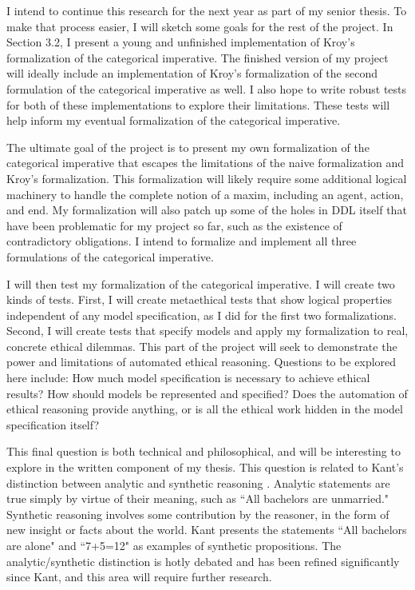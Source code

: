 %
\begin{isabellebody}%
%
%
\isadelimtheory
%
\endisadelimtheory
%
\isatagtheory
%
\endisatagtheory
{\isafoldtheory}%
%
\isadelimtheory
%
\endisadelimtheory
%
\isadelimdocument
%
\endisadelimdocument
%
\isatagdocument
%
\isamarkuptrue%
%
\endisatagdocument
{\isafolddocument}%
%
\isadelimdocument
%
\endisadelimdocument
%
\begin{isamarkuptext}%
I intend to continue this research for the next year as part of my senior thesis. To make that process
easier, I will sketch some goals for the rest of the project. In Section 3.2, I present a young and unfinished 
implementation of Kroy's formalization of the categorical imperative. The finished version of my project will 
ideally include an implementation of Kroy's formalization of the second formulation of the categorical imperative as well.
I also hope to write robust tests for both of these implementations to explore their limitations. These tests
will help inform my eventual formalization of the categorical imperative.

The ultimate goal of the project is to present my own formalization of the categorical imperative that escapes
the limitations of the naive formalization and Kroy's formalization. This formalization
will likely require some additional logical machinery to handle the complete notion of a maxim, including 
an agent, action, and end. My formalization will also patch up some of the holes in DDL itself that have been
problematic for my project so far, such as the existence of contradictory obligations. I intend to formalize and implement
all three formulations of the categorical imperative.

I will then test my formalization of the categorical imperative. I will create two kinds of tests. First,
I will create metaethical tests that show logical properties independent of any model specification, as I did
for the first two formalizations. Second, I will create tests that specify models and apply my formalization
to real, concrete ethical dilemmas. This part of the project will seek to demonstrate the power and limitations of
automated ethical reasoning. Questions to be explored here include: How much model specification is necessary to 
achieve ethical results? How should models be represented and specified? Does the automation of ethical reasoning
provide anything, or is all the ethical work hidden in the model specification itself? 

This final question is both technical and philosophical, and will be interesting to explore in the written
component of my thesis. This question is related to Kant's distinction between analytic and synthetic reasoning \cite{groundwork}. 
Analytic statements are true simply by virtue of their meaning, such as ``All bachelors are unmarried." Synthetic 
reasoning involves some contribution by the reasoner, in the form of new insight or facts about the world.
Kant presents the statements ``All bachelors are alone" and ``7+5=12" as examples of synthetic propositions. 
The analytic/synthetic distinction is hotly debated and has been refined significantly since Kant, and this 
area will require further research.
 

\end{isamarkuptext}
\end{isabellebody}
